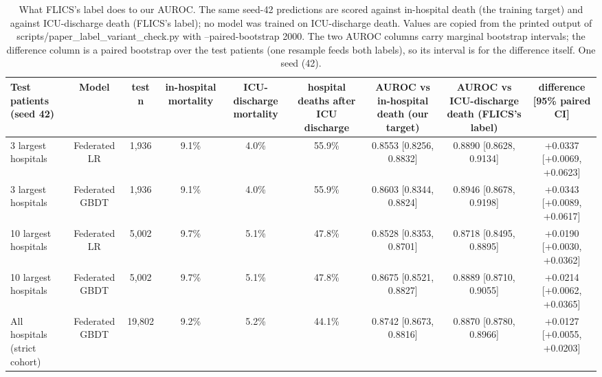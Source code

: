 \begin{table}[t]
\centering\small
\caption{What FLICS's label does to our AUROC. The same seed-42 predictions are scored against in-hospital death (the training target) and against ICU-discharge death (FLICS's label); no model was trained on ICU-discharge death. Values are copied from the printed output of scripts/paper\_label\_variant\_check.py with --paired-bootstrap 2000. The two AUROC columns carry marginal bootstrap intervals; the difference column is a paired bootstrap over the test patients (one resample feeds both labels), so its interval is for the difference itself. One seed (42).}\label{tab:labelvariant}
\begin{tabular}{lcccccccc}
\toprule
Test patients (seed 42) & Model & test n & in-hospital mortality & ICU-discharge mortality & hospital deaths after ICU discharge & AUROC vs in-hospital death (our target) & AUROC vs ICU-discharge death (FLICS's label) & difference [95\% paired CI] \\
\midrule
3 largest hospitals & Federated LR & 1,936 & 9.1\% & 4.0\% & 55.9\% & 0.8553 [0.8256, 0.8832] & 0.8890 [0.8628, 0.9134] & +0.0337 [+0.0069, +0.0623] \\
3 largest hospitals & Federated GBDT & 1,936 & 9.1\% & 4.0\% & 55.9\% & 0.8603 [0.8344, 0.8824] & 0.8946 [0.8678, 0.9198] & +0.0343 [+0.0089, +0.0617] \\
10 largest hospitals & Federated LR & 5,002 & 9.7\% & 5.1\% & 47.8\% & 0.8528 [0.8353, 0.8701] & 0.8718 [0.8495, 0.8895] & +0.0190 [+0.0030, +0.0362] \\
10 largest hospitals & Federated GBDT & 5,002 & 9.7\% & 5.1\% & 47.8\% & 0.8675 [0.8521, 0.8827] & 0.8889 [0.8710, 0.9055] & +0.0214 [+0.0062, +0.0365] \\
All hospitals (strict cohort) & Federated GBDT & 19,802 & 9.2\% & 5.2\% & 44.1\% & 0.8742 [0.8673, 0.8816] & 0.8870 [0.8780, 0.8966] & +0.0127 [+0.0055, +0.0203] \\
\bottomrule
\end{tabular}
\end{table}

